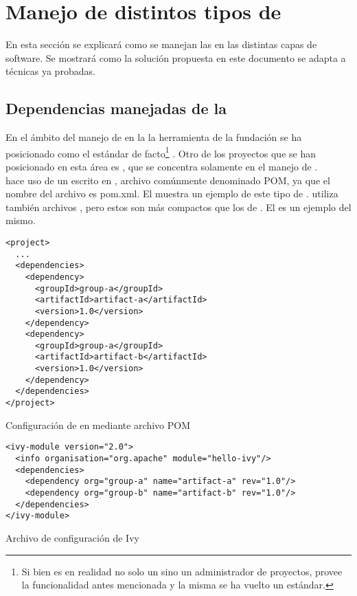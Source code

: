 \section{Manejo de distintos tipos de \dependencies}
\label{appendix:depmgmnt}

En esta sección se explicará como se manejan las \dependencies en las distintas
capas de software. Se mostrará como la solución propuesta en este documento se adapta a técnicas ya probadas.\\

\subsection{Dependencias manejadas de la \logictier}
\label{subsec:depmgmnt:jvm_dev:logic_dependencies}

En el ámbito del manejo de \dependencies en la \logictier la herramienta \maven
de la fundación \apache se ha posicionado como el estándar de facto\footnote{
	Si bien \apache \maven es en realidad no solo un \depmgr sino un 
	administrador de proyectos, provee la funcionalidad antes mencionada y
	la misma se ha vuelto un estándar.
} . Otro de los proyectos que se han posicionado en 
esta área es \apache \ivy, que se concentra solamente en el manejo de 
\dependencies.\\
\maven hace uso de un \conffile escrito en \xml, archivo comúnmente denominado 
POM, ya que el nombre del archivo es pom.xml. El 
 muestra un ejemplo de este tipo de 
\conffile. \ivy utiliza también archivos \xml, pero estos son más compactos que 
los de \maven. El  es un ejemplo del mismo.\\

\begin{listing}[htb]
\begin{verbatim}
<project>
  ...
  <dependencies>
    <dependency>
      <groupId>group-a</groupId>
      <artifactId>artifact-a</artifactId>
      <version>1.0</version>
    </dependency>
    <dependency>
      <groupId>group-a</groupId>
      <artifactId>artifact-b</artifactId>
      <version>1.0</version>
    </dependency>
  </dependencies>
</project>
\end{verbatim}
\caption{Configuración de \dependencies en \maven mediante archivo POM}
\label{code:depmgmnt:jvm:maven_pom}
\end{listing}

\begin{listing}[htb]
\begin{verbatim}
<ivy-module version="2.0">
  <info organisation="org.apache" module="hello-ivy"/>
  <dependencies>
    <dependency org="group-a" name="artifact-a" rev="1.0"/>
    <dependency org="group-b" name="artifact-b" rev="1.0"/>
  </dependencies>
</ivy-module>
\end{verbatim}
\caption{Archivo de configuración de Ivy}
\label{code:depmgmnt:jvm:ivy_module}
\end{listing}

